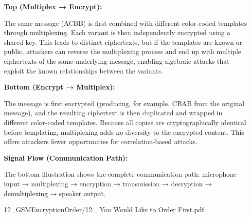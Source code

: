 \begin{SideNotePage}{
  \textbf{Top (Multiplex → Encrypt):} \par The same message (ACBB) is first combined with different color-coded templates through multiplexing. Each variant is then independently encrypted using a shared key. This leads to distinct ciphertexts, but if the templates are known or public, attackers can reverse the multiplexing process and end up with multiple ciphertexts of the same underlying message, enabling algebraic attacks that exploit the known relationships between the variants.

  \textbf{Bottom (Encrypt → Multiplex):} \par The message is first encrypted (producing, for example, CBAB from the original message), and the resulting ciphertext is then duplicated and wrapped in different color-coded templates. Because all copies are cryptographically identical before templating, multiplexing adds no diversity to the encrypted content. This offers attackers fewer opportunities for correlation-based attacks. \par
  \textbf{Signal Flow (Communication Path):} \par The bottom illustration shows the complete communication path: microphone input → multiplexing → encryption → transmission → decryption → demultiplexing → speaker output.

}{12_GSMEncryptionOrder/12_ You Would Like to Order First.pdf}
\end{SideNotePage}
